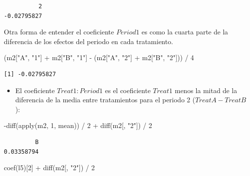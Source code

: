 \documentclass[
  12pt,
  a4paper,
  extrafontsizes,
  onecolumn,
  openright,
  table]{memoir}
\newenvironment{Shaded}{\begin{snugshade}}{\end{snugshade}}
\newcommand{\DecValTok}[1]{\textcolor[rgb]{0.68,0.00,0.00}{#1}}
\newcommand{\FunctionTok}[1]{\textcolor[rgb]{0.28,0.35,0.67}{#1}}
\newcommand{\NormalTok}[1]{\textcolor[rgb]{0.00,0.23,0.31}{#1}}
\newcommand{\SpecialCharTok}[1]{\textcolor[rgb]{0.37,0.37,0.37}{#1}}
\newcommand{\StringTok}[1]{\textcolor[rgb]{0.13,0.47,0.30}{#1}}
\providecommand{\tightlist}{%
  \setlength{\itemsep}{0pt}\setlength{\parskip}{0pt}}\usepackage{longtable,booktabs,array}
\begin{document}
\begin{verbatim}
          2 
-0.02795827 
\end{verbatim}

\normalsize

Otra forma de entender el coeficiente \(Period1\) es como la cuarta
parte de la diferencia de los efectos del periodo en cada tratamiento.

\scriptsize

\begin{Shaded}
\begin{Highlighting}[]
\NormalTok{(m2[}\StringTok{"A"}\NormalTok{, }\StringTok{"1"}\NormalTok{] }\SpecialCharTok{+}\NormalTok{ m2[}\StringTok{"B"}\NormalTok{, }\StringTok{"1"}\NormalTok{] }\SpecialCharTok{{-}}\NormalTok{ (m2[}\StringTok{"A"}\NormalTok{, }\StringTok{"2"}\NormalTok{] }\SpecialCharTok{+}\NormalTok{ m2[}\StringTok{"B"}\NormalTok{, }\StringTok{"2"}\NormalTok{])) }\SpecialCharTok{/} \DecValTok{4}
\end{Highlighting}
\end{Shaded}

\begin{verbatim}
[1] -0.02795827
\end{verbatim}

\normalsize

\begin{itemize}
\tightlist
\item
  El coeficiente \(Treat1:Period1\) es el coeficiente \(Treat1\) menos
  la mitad de la diferencia de la media entre tratamientos para el
  periodo 2 (\(TreatA-TreatB\)):
\end{itemize}

\scriptsize

\begin{Shaded}
\begin{Highlighting}[]
\SpecialCharTok{{-}}\FunctionTok{diff}\NormalTok{(}\FunctionTok{apply}\NormalTok{(m2, }\DecValTok{1}\NormalTok{, mean)) }\SpecialCharTok{/} \DecValTok{2} \SpecialCharTok{+} \FunctionTok{diff}\NormalTok{(m2[, }\StringTok{"2"}\NormalTok{]) }\SpecialCharTok{/} \DecValTok{2}
\end{Highlighting}
\end{Shaded}

\begin{verbatim}
         B 
0.03358794 
\end{verbatim}

\begin{Shaded}
\begin{Highlighting}[]
\FunctionTok{coef}\NormalTok{(l5)[}\DecValTok{2}\NormalTok{] }\SpecialCharTok{+} \FunctionTok{diff}\NormalTok{(m2[, }\StringTok{"2"}\NormalTok{]) }\SpecialCharTok{/} \DecValTok{2}
\end{Highlighting}
\end{Shaded}
\end{document}
